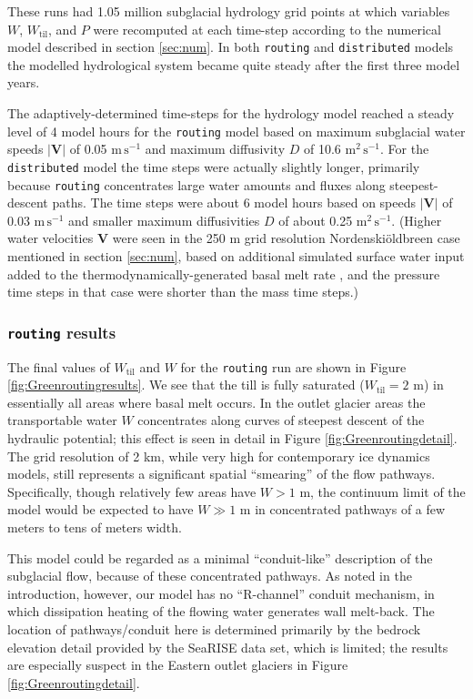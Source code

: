 \documentclass[gmd]{copernicus}   %
\newcommand{\text}{\textrm}
\newcommand\bV{\mathbf{V}}
\newcommand{\Wtil}{W_{\text{til}}}
\newcommand{\Nbreen}{Nordenski\"oldbreen\xspace}
\begin{document}
These runs had 1.05 million subglacial hydrology grid points at which variables $W$, $\Wtil$, and $P$ were recomputed at each time-step according to the numerical model described in section \ref{sec:num}.  In both \texttt{routing} and \texttt{distributed} models the modelled hydrological system became quite steady after the first three model years.

The adaptively-determined time-steps for the hydrology model reached a steady level of 4 model hours for the \texttt{routing} model based on maximum subglacial water speeds $|\bV|$ of 0.05 $\text{m}\,\text{s}^{-1}$ and maximum diffusivity $D$ of 10.6 $\text{m}^2\,\text{s}^{-1}$.  For the \texttt{distributed} model the time steps were actually slightly longer, primarily because \texttt{routing} concentrates large water amounts and fluxes along steepest-descent paths.  The time steps were about 6 model hours based on speeds $|\bV|$ of 0.03 $\text{m}\,\text{s}^{-1}$ and smaller maximum diffusivities $D$ of about 0.25 $\text{m}^2\,\text{s}^{-1}$.  (Higher water velocities $\bV$ were seen in the 250 m grid resolution \Nbreen case mentioned in section \ref{sec:num}, based on additional simulated surface water input added to the thermodynamically-generated basal melt rate \citep{vanPeltthesis}, and the pressure time steps in that case were shorter than the mass time steps.)

\subsubsection{\texttt{routing} results}  The final values of $\Wtil$ and $W$ for the \texttt{routing} run are shown in Figure \ref{fig:Greenroutingresults}.  We see that the till is fully saturated ($\Wtil=2$ m) in essentially all areas where basal melt occurs.  In the outlet glacier areas the transportable water $W$ concentrates along curves of steepest descent of the hydraulic potential; this effect is seen in detail in Figure \ref{fig:Greenroutingdetail}.  The grid resolution of 2 km, while very high for contemporary ice dynamics models, still represents a significant spatial ``smearing'' of the flow pathways.  Specifically, though relatively few areas have $W>1$ m, the continuum limit of the model would be expected to have $W\gg 1$ m in concentrated pathways of a few meters to tens of meters width.

This model could be regarded as a minimal ``conduit-like'' description of the subglacial flow, because of these concentrated pathways.  As noted in the introduction, however, our model has no ``R-channel'' conduit mechanism, in which dissipation heating of the flowing water generates wall melt-back.  The location of pathways/conduit here is determined primarily by the bedrock elevation detail provided by the SeaRISE data set, which is limited; the results are especially suspect in the Eastern outlet glaciers in Figure \ref{fig:Greenroutingdetail}.
\end{document}
